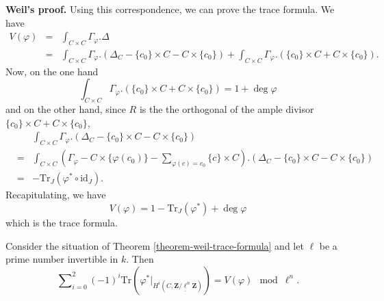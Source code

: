 \medskip\noindent
{\bf Weil's proof.} Using this correspondence, we can prove the trace
formula. We have
\begin{eqnarray*}
V(\varphi) & = & \int_{C \times C} \Gamma_\varphi.\Delta \\
& = & \int_{C \times C} \Gamma_\varphi. \left(\Delta_C - \{c_0\} \times C - C
\times \{c_0\}\right) + \int_{C \times C} \Gamma_\varphi. \left(\{c_0\} \times C
+ C \times \{c_0\}\right).
\end{eqnarray*}
Now, on the one hand
$$
\int_{C \times C} \Gamma_\varphi. \left(\{c_0\} \times C + C \times
\{c_0\}\right)
=
1 + \deg \varphi
$$
and on the other hand, since $R$ is the the orthogonal of the ample divisor
$\{c_0\} \times C + C \times \{c_0\}$,
\begin{eqnarray*}
&&
\int_{C \times C} \Gamma_\varphi. \left(\Delta_C - \{c_0\} \times C - C \times
\{c_0\}\right) \\
& = &
\int_{C \times C} \left(\Gamma_\varphi - C \times \{\varphi(c_0)\} -
\sum_{\varphi(c) = c_0} \{c\} \times C \right). \left(\Delta_C - \{c_0\} \times
C - C \times \{c_0\}\right) \\
& = & - \text{Tr}_J (\varphi^* \circ \text{id}_J).
\end{eqnarray*}
Recapitulating, we have
$$
V(\varphi) = 1 - \text{Tr}_J (\varphi^*) + \deg \varphi
$$
which is the trace formula.

\begin{lemma}
\label{lemma-weil-mod}
Consider the situation of
Theorem \ref{theorem-weil-trace-formula}
and let $\ell$ be a prime number invertible in $k$. Then
$$
\sum\nolimits_{i=0}^2
(-1)^i
\text{Tr}(\varphi^* |_{H^i (C, \underline{\mathbf{Z}/\ell^n \mathbf{Z}})})
=
V(\varphi) \mod \ell^n.
$$
\end{lemma}

